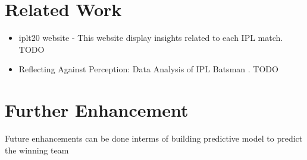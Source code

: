 \section{Related Work} \label{relwork}
\begin {itemize}
\item
iplt20 website - \cite{www-iplt20} 
This website display insights related to each IPL match.
TODO

\item
Reflecting Against Perception: Data Analysis of IPL Batsman \cite{kumar2014reflecting}.
TODO

\end {itemize}

\section{Further Enhancement} \label{enhancements}
Future enhancements can be done interms of building predictive model to predict the winning team

